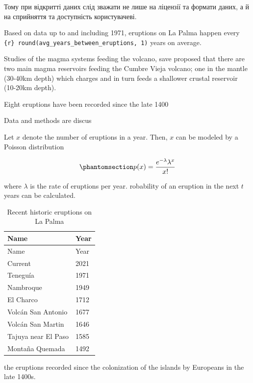 \documentclass[
]{agujournal2019}
\begin{document}
Тому при відкритті даних слід зважати не лише на ліцензії та формати
даних, а й на сприйняття та доступність користувачеві.

Based on data up to and including 1971, eruptions on La Palma happen
every \texttt{\{r\}\ round(avg\_years\_between\_eruptions,\ 1)} years on
average.

Studies of the magma systems feeding the volcano, save proposed that
there are two main magma reservoirs feeding the Cumbre Vieja volcano;
one in the mantle (30-40km depth) which charges and in turn feeds a
shallower crustal reservoir (10-20km depth).

Eight eruptions have been recorded since the late 1400

Data and methods are discus

Let \(x\) denote the number of eruptions in a year. Then, \(x\) can be
modeled by a Poisson distribution

\begin{equation}\phantomsection\label{eq-poisson}{
p(x) = \frac{e^{-\lambda} \lambda^{x}}{x !}
}\end{equation}

where \(\lambda\) is the rate of eruptions per year. robability of an
eruption in the next \(t\) years can be calculated.

\begin{longtable}[]{@{}ll@{}}
\caption{Recent historic eruptions on La
Palma}\label{tbl-history}\tabularnewline
\toprule\noalign{}
Name & Year \\
\midrule\noalign{}
\endfirsthead
\toprule\noalign{}
Name & Year \\
\midrule\noalign{}
\endhead
\bottomrule\noalign{}
\endlastfoot
Current & 2021 \\
Teneguía & 1971 \\
Nambroque & 1949 \\
El Charco & 1712 \\
Volcán San Antonio & 1677 \\
Volcán San Martin & 1646 \\
Tajuya near El Paso & 1585 \\
Montaña Quemada & 1492 \\
\end{longtable}

the eruptions recorded since the colonization of the islands by
Europeans in the late 1400s.
\end{document}
